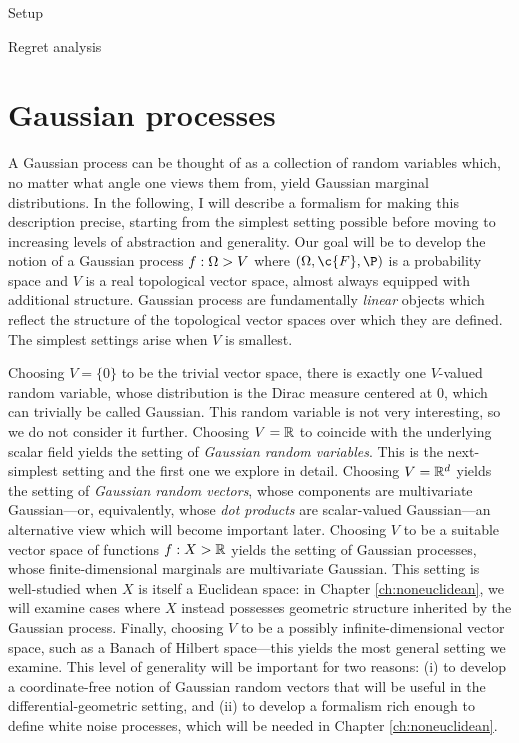 \documentclass[11pt]{book}
\begin{document}
Setup

Regret analysis

\section{Gaussian processes}

A Gaussian process can be thought of as a collection of random variables which, no matter what angle one views them from, yield Gaussian marginal distributions.
In the following, I will describe a formalism for making this description precise, starting from the simplest setting possible before moving to increasing levels of abstraction and generality.
Our goal will be to develop the notion of a Gaussian process $f : \Omega \-> V$ where $(\Omega,\c{F},\P)$ is a probability space and $V$ is a real topological vector space, almost always equipped with additional structure.
Gaussian process are fundamentally \emph{linear} objects which reflect the structure of the topological vector spaces over which they are defined.
The simplest settings arise when $V$ is smallest.

\1  Choosing $V = \{0\}$ to be the trivial vector space, there is exactly one $V$-valued random variable, whose distribution is the Dirac measure centered at $0$, which can trivially be called Gaussian.
This random variable is not very interesting, so we do not consider it further.
\2 Choosing $V = \mathbb{R}$ to coincide with the underlying scalar field yields the setting of \emph{Gaussian random variables}.
This is the next-simplest setting and the first one we explore in detail.
\3 Choosing $V = \mathbb{R}^d$ yields the setting of \emph{Gaussian random vectors}, whose components are multivariate Gaussian---or, equivalently, whose \emph{dot products} are scalar-valued Gaussian---an alternative view which will become important later.
\4 Choosing $V$ to be a suitable vector space of functions $f : X \-> \mathbb{R}$ yields the setting of Gaussian processes, whose finite-dimensional marginals are multivariate Gaussian.
This setting is well-studied when $X$ is itself a Euclidean space: in Chapter \ref{ch:noneuclidean}, we will examine cases where $X$ instead possesses geometric structure inherited by the Gaussian process.
\5 Finally, choosing $V$ to be a possibly infinite-dimensional vector space, such as a Banach of Hilbert space---this yields the most general setting we examine.
This level of generality will be important for two reasons: (i) to develop a coordinate-free notion of Gaussian random vectors that will be useful in the differential-geometric setting, and (ii) to develop a formalism rich enough to define white noise processes, which will be needed in Chapter \ref{ch:noneuclidean}.
\0 
\end{document}
